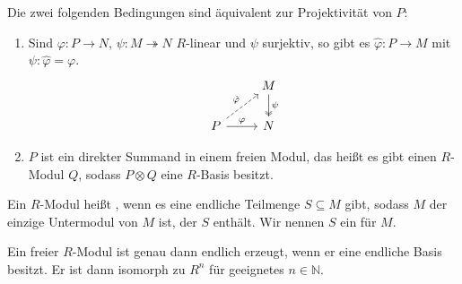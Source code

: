 \begin{bemerkung}[{name=[{Äquivalenzen zu Projektivität}]}]
	Die zwei folgenden Bedingungen sind äquivalent zur Projektivität von $P$:
	\begin{enumerate}[1)]
		\item Sind $\varphi \colon P \to N$, $\psi \colon M \twoheadrightarrow N$ $R$-linear und $\psi$ surjektiv, so gibt es $\hat{\varphi} \colon P \to M$ mit $\psi \colon \hat{\varphi} = \varphi$.
		\[
			\begin{tikzcd}
				& M \dar[two heads,"\psi"] \\
				P \rar["\varphi"] \urar["\hat{\varphi}",dashed] & N
			\end{tikzcd}
		\]
		\item $P$ ist ein direkter Summand in einem freien Modul, das heißt es gibt einen $R$-Modul $Q$, sodass $P \otimes Q$ eine $R$-Basis besitzt.
	\end{enumerate}
\end{bemerkung}

\begin{definition}[{name=[{endlich erzeugter $R$-Modul}]}]
	Ein $R$-Modul heißt , wenn es eine endliche Teilmenge $S \subseteq M$ gibt, sodass $M$ der einzige Untermodul von $M$ ist, der $S$ enthält.
	Wir nennen $S$ ein  für $M$.
\end{definition}

\begin{bemerkung}[{name=[{endlich erzeugte freie Moduln}]}]
	Ein freier $R$-Modul ist genau dann endlich erzeugt, wenn er eine endliche Basis besitzt.
	Er ist dann isomorph zu $R^n$ für geeignetes $n \in \mathbb{N}$.
\end{bemerkung}

